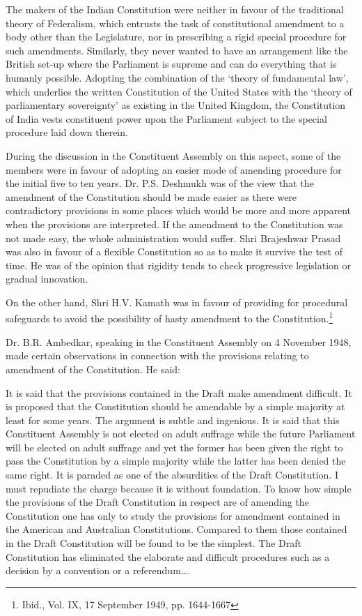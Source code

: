 \begin{multicols}{2}

\noi
The makers of the Indian Constitution were neither in favour of the traditional theory of
Federalism, which entrusts the task of constitutional amendment to a body other than the
Legislature, nor in prescribing a rigid special procedure for such amendments. Similarly, they
never wanted to have an arrangement like the British set-up where the Parliament is supreme
and can do everything that is humanly possible. Adopting the combination of the ‘theory of
fundamental law’, which underlies the written Constitution of the United States with the
‘theory of parliamentary sovereignty’ as existing in the United Kingdom, the Constitution of
India vests constituent power upon the Parliament subject to the special procedure laid down
therein.

\noi
During the discussion in the Constituent Assembly on this aspect, some of the members were
in favour of adopting an easier mode of amending procedure for the initial five to ten years.
Dr. P.S. Deshmukh was of the view that the amendment of the Constitution should be made
easier as there were contradictory provisions in some places which would be more and more
apparent when the provisions are interpreted. If the amendment to the Constitution was not
made easy, the whole administration would suffer. Shri Brajeshwar Prasad was also in favour of a flexible Constitution so as to make it survive the test of time. He was of the opinion that
rigidity tends to check progressive legislation or gradual innovation.

\noi
On the other hand, Shri H.V. Kamath was in favour of providing for procedural safeguards to
avoid the possibility of hasty amendment to the Constitution.\footnote{Ibid., Vol. IX, 17 September 1949, pp. 1644-1667}

\noi
Dr. B.R. Ambedkar, speaking in the Constituent Assembly on 4 November 1948, made certain
observations in connection with the provisions relating to amendment of the Constitution. He
said:

\noi
It is said that the provisions contained in the Draft make amendment difficult. It is proposed
that the Constitution should be amendable by a simple majority at least for some years. The
argument is subtle and ingenious. It is said that this Constituent Assembly is not elected on
adult suffrage while the future Parliament will be elected on adult suffrage and yet the former
has been given the right to pass the Constitution by a simple majority while the latter has been
denied the same right. It is paraded as one of the absurdities of the Draft Constitution. I must
repudiate the charge because it is without foundation. To know how simple the provisions of
the Draft Constitution in respect are of amending the Constitution one has only to study the
provisions for amendment contained in the American and Australian Constitutions. Compared
to them those contained in the Draft Constitution will be found to be the simplest. The Draft
Constitution has eliminated the elaborate and difficult procedures such as a decision by a
convention or a referendum….


\end{multicols}
